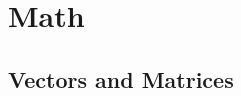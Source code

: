

\subtitle{Part I -- Math and Minimizers\\\vspace*{1.5ex}
  \small \textbf{Goal:} Give a short reminder of the underlying math of machine learning algorithms
}


  
  \maketitle

  \section{Math}

  \subsection{Vectors and Matrices}

